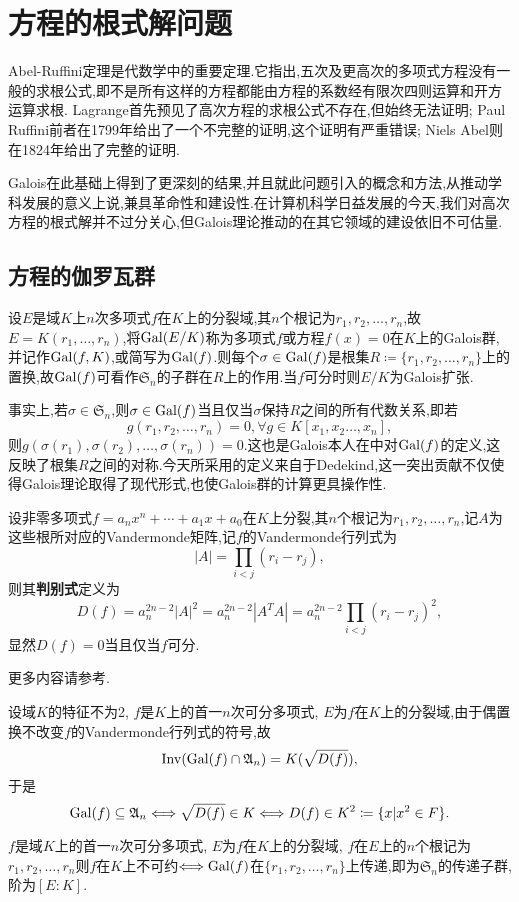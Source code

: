 \chapter{方程的根式解问题}
Abel-Ruffini定理是代数学中的重要定理.它指出,五次及更高次的多项式方程没有一般的求根公式,即不是所有这样的方程都能由方程的系数经有限次四则运算和开方运算求根. Lagrange首先预见了高次方程的求根公式不存在,但始终无法证明; Paul Ruffini前者在1799年给出了一个不完整的证明,这个证明有严重错误; Niels Abel则在1824年给出了完整的证明. 

Galois在此基础上得到了更深刻的结果,并且就此问题引入的概念和方法,从推动学科发展的意义上说,兼具革命性和建设性.在计算机科学日益发展的今天,我们对高次方程的根式解并不过分关心,但Galois理论推动的在其它领域的建设依旧不可估量.
\section{方程的伽罗瓦群}
\begin{definition}
	设$E$是域$K$上$n$次多项式$f$在$K$上的分裂域,其$n$个根记为$r_1,r_2,\dots,r_n$,故$E=K(r_1,\dots,r_n)$,将$\operatorname{\mathrm{Gal}}(E/K)$称为多项式$f$或方程$f(x)=0$在$K$上的Galois群,并记作$\operatorname{\mathrm{Gal}}(f,K)$,或简写为$\operatorname{\mathrm{Gal}}(f)$.则每个$\sigma\in\operatorname{\mathrm{Gal}}(f)$是根集$R\coloneqq\{r_1,r_2,\dots,r_n\}$上的置换,故$\operatorname{\mathrm{Gal}}(f)$可看作$\mathfrak{S}_n$的子群在$R$上的作用.当$f$可分时则$E/K$为Galois扩张.
\end{definition}

事实上,若$\sigma\in\mathfrak{S}_n$,则$\sigma\in\operatorname{\mathrm{Gal}}(f)$当且仅当$\sigma$保持$R$之间的所有代数关系,即若
\[
g(r_1,r_2,\dots,r_n)=0,\forall g\in K[x_1,x_2\dots,x_n],
\]
则$g(\sigma(r_1),\sigma(r_2),\dots,\sigma(r_n))=0$.这也是Galois本人在\cite{Galois}中对$\operatorname{\mathrm{Gal}}(f)$的定义,这反映了根集$R$之间的对称.今天所采用的定义来自于Dedekind,这一突出贡献不仅使得Galois理论取得了现代形式,也使Galois群的计算更具操作性.
\begin{definition}
	设非零多项式$f=a_nx^n+\cdots+a_1x+a_0$在$K$上分裂,其$n$个根记为$r_1,r_2,\dots,r_n$,记$A$为这些根所对应的Vandermonde矩阵,记$f$的Vandermonde行列式为
	\[
	|A|=\prod_{i<j}\left(r_i-r_j\right),
	\]
	则其\textbf{判别式}定义为
	\[
	D(f)=a_n^{2n-2}|A|^2=a_n^{2n-2}|A^TA|=a_n^{2n-2}\prod_{i<j}\left(r_i-r_j\right)^2,
	\]
	显然$D(f)=0$当且仅当$f$可分.
\end{definition}

更多内容请参考\cite[\S 4.5]{LJ}.
\begin{lemma}
	设域$K$的特征不为2, $f$是$K$上的首一$n$次可分多项式, $E$为$f$在$K$上的分裂域,由于偶置换不改变$f$的Vandermonde行列式的符号,故
	\[
	\operatorname{\mathrm{Inv}}(\operatorname{\mathrm{Gal}}(f)\cap\mathfrak{A}_n)=K(\sqrt{D(f)}),
	\]
	于是
	\[
	\operatorname{\mathrm{Gal}}(f)\subseteq \mathfrak{A}_n\Longleftrightarrow \sqrt{D(f)}\in K\Longleftrightarrow D(f)\in K^2\coloneqq\{x|x^2\in F\}.
	\]
\end{lemma}
\begin{lemma}
	$f$是域$K$上的首一$n$次可分多项式, $E$为$f$在$K$上的分裂域, $f$在$E$上的$n$个根记为$r_1,r_2,\dots,r_n$则$f$在$K$上不可约$\Longleftrightarrow \operatorname{\mathrm{Gal}}(f)$在$\{r_1,r_2,\dots,r_n\}$上传递,即为$\mathfrak{S}_n$的传递子群,阶为$[E:K]$.
\end{lemma}

